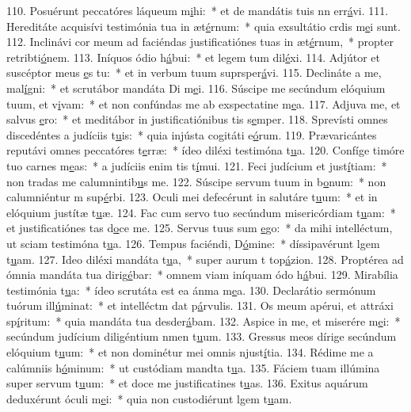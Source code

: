 110. Posuérunt peccatóres láqueum m\uline{i}hi:~* et de mandátis tuis nn err\uline{á}vi.
111. Hereditáte acquisívi testimónia tua in æt\uline{é}rnum:~* quia exsultátio crdis m\uline{e}i sunt.
112. Inclinávi cor meum ad faciéndas justificatiónes tuas in æt\uline{é}rnum,~* propter retribti\uline{ó}nem.
113. Iníquos ódio h\uline{á}bui:~* et legem tum dil\uline{é}xi.
114. Adjútor et suscéptor meus \uline{e}s tu:~* et in verbum tuum suprsper\uline{á}vi.
115. Declináte a me, mal\uline{í}gni:~* et scrutábor mandáta Di m\uline{e}i.
116. Súscipe me secúndum elóquium tuum, et v\uline{i}vam:~* et non confúndas me ab exspectatine m\uline{e}a.
117. Adjuva me, et salvus \uline{e}ro:~* et meditábor in justificatiónibus tis s\uline{e}mper.
118. Sprevísti omnes discedéntes a judíciis t\uline{u}is:~* quia injústa cogitáti e\uline{ó}rum.
119. Prævaricántes reputávi omnes peccatóres t\uline{e}rræ:~* ídeo diléxi testimóna t\uline{u}a.
120. Confíge timóre tuo carnes m\uline{e}as:~* a judíciis enim tis t\uline{í}mui.
121. Feci judícium et just\uline{í}tiam:~* non tradas me calumnintib\uline{u}s me.
122. Súscipe servum tuum in b\uline{o}num:~* non calumniéntur m sup\uline{é}rbi.
123. Oculi mei defecérunt in salutáre t\uline{u}um:~* et in elóquium justítæ t\uline{u}æ.
124. Fac cum servo tuo secúndum misericórdiam t\uline{u}am:~* et justificatiónes tas d\uline{o}ce me.
125. Servus tuus sum \uline{e}go:~* da mihi intelléctum, ut sciam testimóna t\uline{u}a.
126. Tempus faciéndi, D\uline{ó}mine:~* díssipavérunt lgem t\uline{u}am.
127. Ideo diléxi mandáta t\uline{u}a,~* super aurum t top\uline{á}zion.
128. Proptérea ad ómnia mandáta tua dirig\uline{é}bar:~* omnem viam iníquam ódo h\uline{á}bui.
129. Mirabília testimónia t\uline{u}a:~* ídeo scrutáta est ea ánma m\uline{e}a.
130. Declarátio sermónum tuórum ill\uline{ú}minat:~* et intelléctm dat p\uline{á}rvulis.
131. Os meum apérui, et attráxi sp\uline{í}ritum:~* quia mandáta tua desder\uline{á}bam.
132. Aspice in me, et miserére m\uline{e}i:~* secúndum judícium diligéntium nmen t\uline{u}um.
133. Gressus meos dírige secúndum elóquium t\uline{u}um:~* et non dominétur mei omnis njust\uline{í}tia.
134. Rédime me a calúmniis h\uline{ó}minum:~* ut custódiam mandta t\uline{u}a.
135. Fáciem tuam illúmina super servum t\uline{u}um:~* et doce me justificatines t\uline{u}as.
136. Exitus aquárum deduxérunt óculi m\uline{e}i:~* quia non custodiérunt lgem t\uline{u}am.
